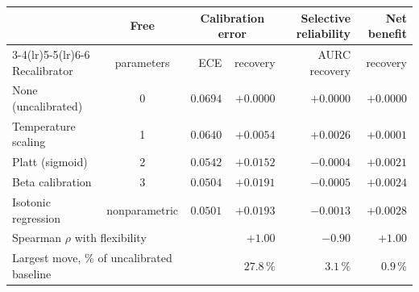\begin{tabular}{lcrrrr}
\toprule
& Free & \multicolumn{2}{c}{Calibration error} & Selective reliability & Net benefit \\
\cmidrule(lr){3-4}\cmidrule(lr){5-5}\cmidrule(lr){6-6}
Recalibrator & parameters & ECE & recovery & AURC recovery & recovery \\
\midrule
None (uncalibrated) & 0             & $0.0694$ & $+0.0000$ & $+0.0000$ & $+0.0000$ \\
Temperature scaling & 1             & $0.0640$ & $+0.0054$ & $+0.0026$ & $+0.0001$ \\
Platt (sigmoid)     & 2             & $0.0542$ & $+0.0152$ & $-0.0004$ & $+0.0021$ \\
Beta calibration    & 3             & $0.0504$ & $+0.0191$ & $-0.0005$ & $+0.0024$ \\
Isotonic regression & nonparametric & $0.0501$ & $+0.0193$ & $-0.0013$ & $+0.0028$ \\
\midrule
\multicolumn{2}{l}{Spearman $\rho$ with flexibility} & & $+1.00$ & $-0.90$ & $+1.00$ \\
\multicolumn{2}{l}{Largest move, \% of uncalibrated baseline} & & $27.8\,\%$ & $3.1\,\%$ & $0.9\,\%$ \\
\bottomrule
\end{tabular}
